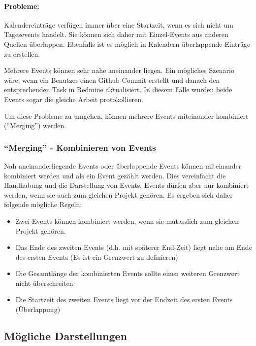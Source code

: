 \documentclass[]{article}
\begin{document}
\paragraph{Probleme:}\label{probleme}

Kalendereinträge verfügen immer über eine Startzeit, wenn es sich nicht
um Tagesevents handelt. Sie können sich daher mit Einzel-Events aus
anderen Quellen überlappen. Ebenfalls ist es möglich in Kalendern
überlappende Einträge zu erstellen.

Mehrere Events können sehr nahe aneinander liegen. Ein mögliches
Szenario wäre, wenn ein Benutzer einen Github-Commit erstellt und danach
den entsprechenden Task in Redmine aktualisiert. In diesem Falle würden
beide Events sogar die gleiche Arbeit protokollieren.

Um diese Probleme zu umgehen, können mehrere Events miteinander
kombiniert (``Merging'') werden.

\subsubsection{\texorpdfstring{``Merging'' - Kombinieren von
Events}{Merging - Kombinieren von Events}}\label{merging---kombinieren-von-events}

Nah aneinanderliegende Events oder überlappende Events können
miteinander kombiniert werden und als ein Event gezählt werden. Dies
vereinfacht die Handhabung und die Darstellung von Events. Events dürfen
aber nur kombiniert werden, wenn sie auch zum gleichen Projekt gehören.
Es ergeben sich daher folgende mögliche Regeln:

\begin{itemize}
\itemsep1pt\parskip0pt
\item
  Zwei Events können kombiniert werden, wenn sie mutasslich zum gleichen
  Projekt gehören.
\item
  Das Ende des zweiten Events (d.h. mit späterer End-Zeit) liegt nahe am
  Ende des ersten Events (Es ist ein Grenzwert zu definieren)
\item
  Die Gesamtlänge der kombinierten Events sollte einen weiteren
  Grenzwert nicht überschreiten
\item
  Die Startzeit des zweiten Events liegt vor der Endzeit des ersten
  Events (Überlappung)
\end{itemize}

\subsection{Mögliche Darstellungen}\label{muxf6gliche-darstellungen}
\end{document}

